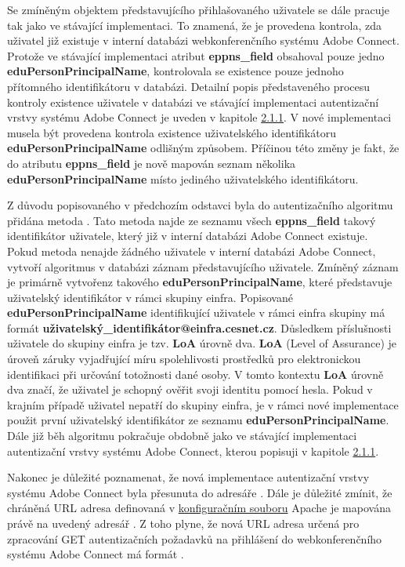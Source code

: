 \documentclass[
  printed, %
  twoside, %
  table,   %
  nolof,     %
  nolot,     %
]{fithesis3}
\begin{document}
Se zmíněným objektem představujícího přihlašovaného uživatele se dále pracuje tak jako ve stávající implementaci. To znamená, že je provedena kontrola, zda uživatel již existuje v interní databázi webkonferenčního systému Adobe Connect. Protože ve stávající implementaci atribut \textbf{eppns\_field} obsahoval pouze jedno \textbf{eduPersonPrincipalName}, kontrolovala se existence pouze jednoho přítomného identifikátoru v databázi. Detailní popis představeného procesu kontroly existence uživatele v databázi ve stávající implementaci autentizační vrstvy systému Adobe Connect je uveden v kapitole \hyperref[ac-old]{2.1.1}. V nové implementaci musela být provedena kontrola existence uživatelského identifikátoru \textbf{eduPersonPrincipalName} odlišným způsobem. Příčinou této změny je fakt, že do atributu \textbf{eppns\_field} je nově mapován seznam několika \textbf{eduPersonPrincipalName} místo jediného uživatelského identifikátoru.
\par
Z důvodu popisovaného v předchozím odstavci byla do autentizačního algoritmu přidána metoda . Tato metoda najde ze seznamu všech \textbf{eppns\_field} takový identifikátor uživatele, který již v interní databázi Adobe Connect existuje. Pokud metoda  nenajde žádného uživatele v interní databázi Adobe Connect, vytvoří algoritmus v databázi záznam představujícího uživatele. Zmíněný záznam je primárně vytvořen\break z takového \textbf{eduPersonPrincipalName}, které představuje uživatelský identifikátor v rámci skupiny einfra. Popisované \textbf{eduPersonPrincipalName} identifikující uživatele v rámci einfra skupiny má formát \textbf{{uživatelský\_identifikátor}@einfra.cesnet.cz}. Důsledkem příslušnosti uživatele do skupiny einfra je tzv. \textbf{LoA} úrovně dva. \textbf{LoA} (Level of Assurance) \cite{rfc6711} je úroveň záruky vyjadřující míru spolehlivosti prostředků pro
elektronickou identifikaci při určování totožnosti dané osoby. V tomto kontextu \textbf{LoA} úrovně dva značí, že uživatel je schopný ověřit svoji identitu pomocí hesla.  Pokud v krajním případě uživatel nepatří do skupiny einfra, je v rámci nové implementace použit první uživatelský identifikátor ze seznamu \textbf{eduPersonPrincipalName}. Dále již běh algoritmu pokračuje obdobně jako ve stávající implementaci autentizační vrstvy systému Adobe Connect, kterou popisuji v kapitole \hyperref[ac-old]{2.1.1}. 


\par 
Nakonec je důležité poznamenat, že nová implementace autentizační vrstvy systému Adobe Connect byla přesunuta do adresáře . Dále je důležité zmínit, že chráněná URL adresa definovaná v \hyperref[ac-location]{konfiguračním souboru} Apache je mapována právě na uvedený adresář . Z toho plyne, že nová URL adresa určená pro zpracování GET autentizačních požadavků na přihlášení do webkonferenčního systému Adobe Connect má formát .
\end{document}
